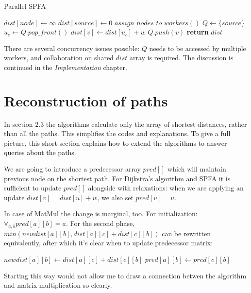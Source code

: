 \documentclass[12pt,a4paper,twoside,openright]{report}
\begin{document}
\begin{algorithm}
\caption{Parallel SPFA}\label{pspfa}
\begin{algorithmic}[1]
    \State $dist[node] \gets \infty$
\EndFor
\State $dist[source] \gets 0$
\State $assign\_nodes\_to\_workers()$
\State $Q \gets \{source\}$ 
        \State $u_c \gets Q.pop\_front()$
            \State $dist[v] \gets dist[u_c] + w$
                \State $Q.push(v)$
                \EndIf
        \EndIf
        \EndFor
      \EndFor
    \EndWhile
\State \textbf{return} $dist$
\EndProcedure
\end{algorithmic}
\end{algorithm}

There are several concurrency issues possible: $Q$ needs to be accessed by multiple workers, and collaboration on shared $dist$ array is required. The discussion is continued in the \textit{Implementation} chapter.

\section{Reconstruction of paths}
In section $2.3$ the algorithms calculate only the array of shortest distances, rather than all the paths. This simplifies the codes and explanations. To give a full picture, this short section explains how to extend the algorithms to answer queries about the paths.

We are going to introduce a predecessor array $pred[]$ which will maintain previous node on the shortest path. For Dijkstra's algorithm and SPFA it is sufficient to update $pred[]$ alongside with relaxations: when we are applying an update $dist[v] = dist[u] + w$, we also set $pred[v] = u$.

In case of MatMul the change is marginal, too. For initialization:$\displaystyle\mathop{\forall}_{a,b}pred[a][b] = a$. For the second phase, $min(newdist[a][b],dist[a][c]+dist[c][b])$ can be rewritten equivalently, after which it's clear when to update predecessor matrix:

\begin{algorithm}
\begin{algorithmic}[1]
        \State $newdist[a][b] \gets dist[a][c] + dist[c][b]$
        \State $pred[a][b] \gets pred[c][b]$
    \EndIf
\end{algorithmic}
\end{algorithm}
Starting this way would not allow me to draw a connection betwen the algorithm and matrix multiplication so clearly.
\end{document}
